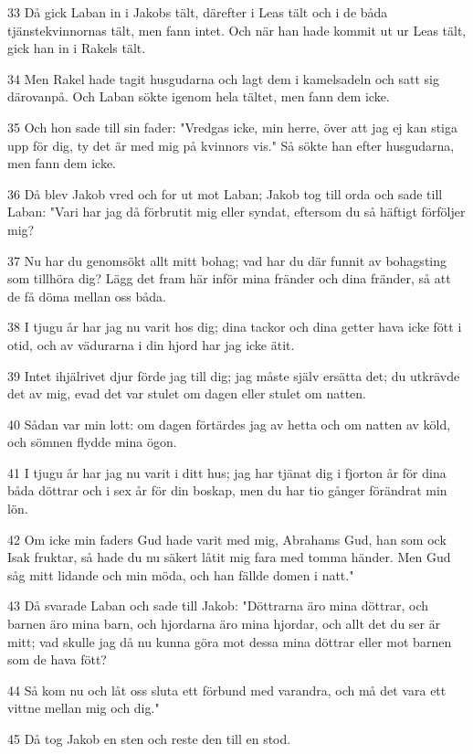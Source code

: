 \par 33 Då gick Laban in i Jakobs tält, därefter i Leas tält och i de båda tjänstekvinnornas tält, men fann intet. Och när han hade kommit ut ur Leas tält, gick han in i Rakels tält.
\par 34 Men Rakel hade tagit husgudarna och lagt dem i kamelsadeln och satt sig därovanpå. Och Laban sökte igenom hela tältet, men fann dem icke.
\par 35 Och hon sade till sin fader: "Vredgas icke, min herre, över att jag ej kan stiga upp för dig, ty det är med mig på kvinnors vis." Så sökte han efter husgudarna, men fann dem icke.
\par 36 Då blev Jakob vred och for ut mot Laban; Jakob tog till orda och sade till Laban: "Vari har jag då förbrutit mig eller syndat, eftersom du så häftigt förföljer mig?
\par 37 Nu har du genomsökt allt mitt bohag; vad har du där funnit av bohagsting som tillhöra dig? Lägg det fram här inför mina fränder och dina fränder, så att de få döma mellan oss båda.
\par 38 I tjugu år har jag nu varit hos dig; dina tackor och dina getter hava icke fött i otid, och av vädurarna i din hjord har jag icke ätit.
\par 39 Intet ihjälrivet djur förde jag till dig; jag måste själv ersätta det; du utkrävde det av mig, evad det var stulet om dagen eller stulet om natten.
\par 40 Sådan var min lott: om dagen förtärdes jag av hetta och om natten av köld, och sömnen flydde mina ögon.
\par 41 I tjugu år har jag nu varit i ditt hus; jag har tjänat dig i fjorton år för dina båda döttrar och i sex år för din boskap, men du har tio gånger förändrat min lön.
\par 42 Om icke min faders Gud hade varit med mig, Abrahams Gud, han som ock Isak fruktar, så hade du nu säkert låtit mig fara med tomma händer. Men Gud såg mitt lidande och min möda, och han fällde domen i natt."
\par 43 Då svarade Laban och sade till Jakob: "Döttrarna äro mina döttrar, och barnen äro mina barn, och hjordarna äro mina hjordar, och allt det du ser är mitt; vad skulle jag då nu kunna göra mot dessa mina döttrar eller mot barnen som de hava fött?
\par 44 Så kom nu och låt oss sluta ett förbund med varandra, och må det vara ett vittne mellan mig och dig."
\par 45 Då tog Jakob en sten och reste den till en stod.
